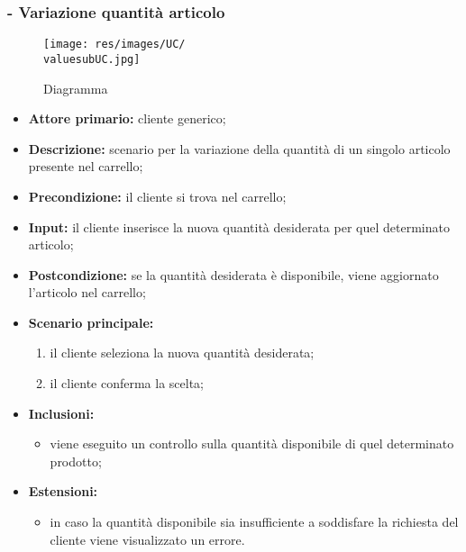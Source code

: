 \stepsubUserCase
\subsubsection{ - Variazione quantità articolo}
\begin{figure}[H]
    \centering
    \texttt{[image: res/images/UC/\\valuesubUC.jpg]}
    \caption{Diagramma }
\end{figure}
\begin{itemize}
    \item \textbf{Attore primario:} cliente generico;
    \item \textbf{Descrizione:} scenario per la variazione della quantità di un singolo articolo presente nel carrello;
    \item \textbf{Precondizione:} il cliente si trova nel carrello;
    \item \textbf{Input:} il cliente inserisce la nuova quantità desiderata per quel determinato articolo;
    \item \textbf{Postcondizione:} se la quantità desiderata è disponibile, viene aggiornato l'articolo nel carrello;
    \item \textbf{Scenario principale:}
          \begin{enumerate}
              \item il cliente seleziona la nuova quantità desiderata;
              \item il cliente conferma la scelta;
          \end{enumerate}
    \item \textbf{Inclusioni:}
          \begin{itemize}
              \item viene eseguito un controllo sulla quantità disponibile di quel determinato prodotto;
          \end{itemize}
    \item \textbf{Estensioni:}
          \begin{itemize}
              \item in caso la quantità disponibile sia insufficiente a soddisfare la richiesta del cliente viene visualizzato un errore.
          \end{itemize}
\end{itemize}

\stepsubUserCase
